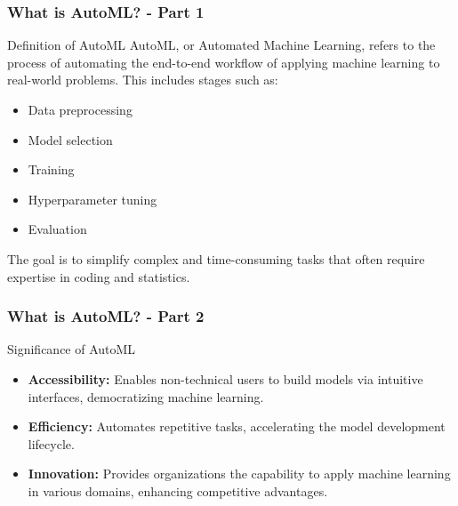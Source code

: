 \documentclass[aspectratio=169]{beamer}
\begin{document}
\begin{frame}[fragile]
    \frametitle{What is AutoML? - Part 1}
    \begin{block}{Definition of AutoML}
        AutoML, or Automated Machine Learning, refers to the process of automating the end-to-end workflow of applying machine learning to real-world problems. This includes stages such as:
        \begin{itemize}
            \item Data preprocessing
            \item Model selection
            \item Training
            \item Hyperparameter tuning
            \item Evaluation
        \end{itemize}
        The goal is to simplify complex and time-consuming tasks that often require expertise in coding and statistics.
    \end{block}
\end{frame}

\begin{frame}[fragile]
    \frametitle{What is AutoML? - Part 2}
    \begin{block}{Significance of AutoML}
        \begin{itemize}
            \item \textbf{Accessibility:} Enables non-technical users to build models via intuitive interfaces, democratizing machine learning.
            \item \textbf{Efficiency:} Automates repetitive tasks, accelerating the model development lifecycle.
            \item \textbf{Innovation:} Provides organizations the capability to apply machine learning in various domains, enhancing competitive advantages.
        \end{itemize}
    \end{block}
\end{frame}
\end{document}
